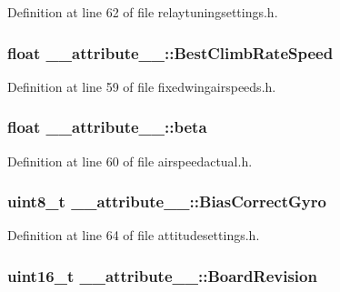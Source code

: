 \-Definition at line 62 of file relaytuningsettings.\-h.

\hypertarget{struct____attribute_____a631842c995595027aa7e8c408d5debd1}{
\subsubsection[{\-Best\-Climb\-Rate\-Speed}]{\setlength{\rightskip}{0pt plus 5cm}float {\bf \-\_\-\-\_\-attribute\-\_\-\-\_\-\-::\-Best\-Climb\-Rate\-Speed}}}\label{struct____attribute_____a631842c995595027aa7e8c408d5debd1}


\-Definition at line 59 of file fixedwingairspeeds.\-h.

\hypertarget{struct____attribute_____a320b79908f216db8bead575dff9f4b89}{
\subsubsection[{beta}]{\setlength{\rightskip}{0pt plus 5cm}float {\bf \-\_\-\-\_\-attribute\-\_\-\-\_\-\-::beta}}}\label{struct____attribute_____a320b79908f216db8bead575dff9f4b89}


\-Definition at line 60 of file airspeedactual.\-h.

\hypertarget{struct____attribute_____a112b0f2217f918b8c50970ab2fc4b509}{
\subsubsection[{\-Bias\-Correct\-Gyro}]{\setlength{\rightskip}{0pt plus 5cm}uint8\-\_\-t {\bf \-\_\-\-\_\-attribute\-\_\-\-\_\-\-::\-Bias\-Correct\-Gyro}}}\label{struct____attribute_____a112b0f2217f918b8c50970ab2fc4b509}


\-Definition at line 64 of file attitudesettings.\-h.

\hypertarget{struct____attribute_____a066bbda6728d120286459266f836a9e5}{
\subsubsection[{\-Board\-Revision}]{\setlength{\rightskip}{0pt plus 5cm}uint16\-\_\-t {\bf \-\_\-\-\_\-attribute\-\_\-\-\_\-\-::\-Board\-Revision}}}\label{struct____attribute_____a066bbda6728d120286459266f836a9e5}


